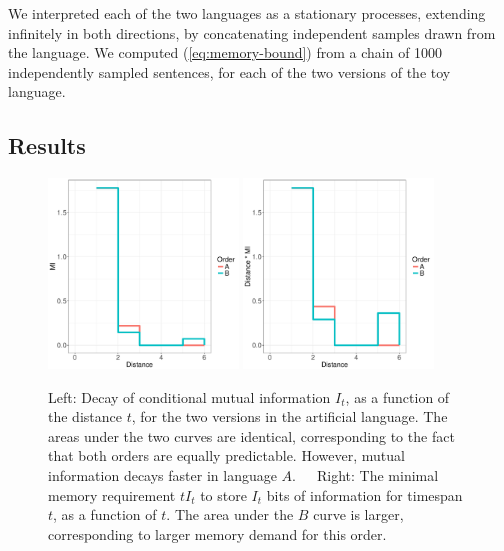 

We interpreted each of the two languages as a stationary processes, extending infinitely in both directions, by concatenating independent samples drawn from the language.
We computed (\ref{eq:memory-bound}) from a chain of 1000 independently sampled sentences, for each of the two versions of the toy language.

\subsection{Results}	

\begin{figure}
\centering
\includegraphics[width=0.45\textwidth]{figures/toy-mis.pdf}
\includegraphics[width=0.45\textwidth]{figures/toy-t-mis.pdf}
%
	\caption{Left: Decay of conditional mutual information $I_t$, as a function of the distance $t$, for the two versions in the artificial language. The areas under the two curves are identical, corresponding to the fact that both orders are equally predictable. However, mutual information decays faster in language $A$.\ \ \ Right: The minimal memory requirement $t I_t$ to store $I_t$ bits of information for timespan $t$, as a function of $t$. The area under the $B$ curve is larger, corresponding to larger memory demand for this order.}\label{fig:toy-mis}
\end{figure}

